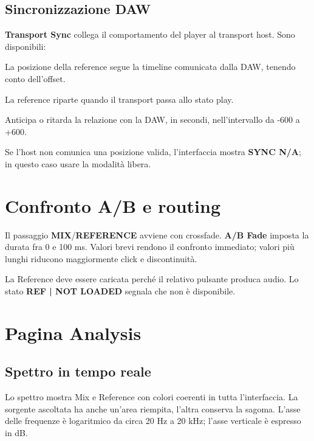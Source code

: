 \documentclass[11pt,a4paper]{article}
\newcommand{\control}[1]{\textbf{\textsf{#1}}}
\begin{document}
\subsection{Sincronizzazione DAW}

\control{Transport Sync} collega il comportamento del player al transport host.
Sono disponibili:

\begin{description}[style=nextline]
  \item[\control{Timeline}] La posizione della reference segue la timeline
  comunicata dalla DAW, tenendo conto dell'offset.
  \item[\control{Restart on Play}] La reference riparte quando il transport
  passa allo stato play.
  \item[\control{Sync Offset}] Anticipa o ritarda la relazione con la DAW, in
  secondi, nell'intervallo da -600 a +600.
\end{description}

Se l'host non comunica una posizione valida, l'interfaccia mostra
\control{SYNC N/A}; in questo caso usare la modalità libera.

\section{Confronto A/B e routing}

Il passaggio \control{MIX}/\control{REFERENCE} avviene con crossfade.
\control{A/B Fade} imposta la durata fra 0 e 100 ms. Valori brevi rendono il
confronto immediato; valori più lunghi riducono maggiormente click e discontinuità.

La Reference deve essere caricata perché il relativo pulsante produca audio.
Lo stato \control{REF | NOT LOADED} segnala che non è disponibile.

\section{Pagina Analysis}

\subsection{Spettro in tempo reale}

Lo spettro mostra Mix e Reference con colori coerenti in tutta l'interfaccia.
La sorgente ascoltata ha anche un'area riempita, l'altra conserva la sagoma.
L'asse delle frequenze è logaritmico da circa 20 Hz a 20 kHz; l'asse verticale
è espresso in dB.
\end{document}

